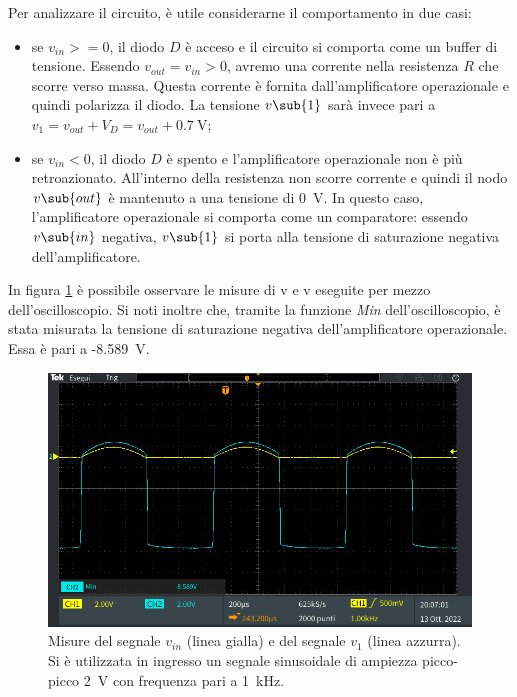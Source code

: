 Per analizzare il circuito, è utile considerarne il comportamento in due casi:
\begin{itemize}
	\item se $v_{in}>=0$, il diodo $D$ è acceso e il circuito si comporta come un buffer di tensione. Essendo $v_{out}=v_{in}>0$, avremo una corrente nella resistenza $R$ che scorre verso massa. Questa corrente è fornita dall'amplificatore operazionale e quindi polarizza il diodo. La tensione $v\sub{1}$ sarà invece pari a $v_1=v_{out}+V_D=v_{out}+\SI{0.7}{\volt}$;
	\item se $v_{in}<0$, il diodo $D$ è spento e l'amplificatore operazionale non è più retroazionato. All'interno della resistenza non scorre corrente e quindi il nodo $v\sub{out}$ è mantenuto a una tensione di \SI{0}{\volt}. In questo caso, l'amplificatore operazionale si comporta come un comparatore: essendo $v\sub{in}$ negativa, $v\sub{1}$ si porta alla tensione di saturazione negativa dell'amplificatore.
\end{itemize}

\noindent
In figura \ref{fig:analisi_circuito_2_1} è possibile osservare le misure di v e v eseguite per mezzo dell'oscilloscopio. Si noti inoltre che, tramite la funzione \textit{Min} dell'oscilloscopio, è stata misurata la tensione di saturazione negativa dell'amplificatore operazionale. Essa è pari a -\SI{8.589}{\volt}.
\begin{figure}[h]
	\centering
	\includegraphics[width=1\linewidth]{./ImageFiles/Laboratorio 2/TEK00030}
	\caption{Misure del segnale $v_{in}$ (linea gialla) e del segnale $v_{1}$ (linea azzurra). Si è utilizzata in ingresso un segnale sinusoidale di ampiezza picco-picco \SI{2}{\volt} con frequenza pari a \SI{1}{\kilo\hertz}.}
	\label{fig:analisi_circuito_2_1}
\end{figure}

